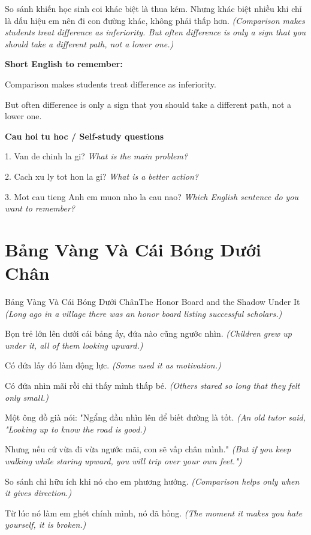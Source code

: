\begin{baihoc}
So sánh khiến học sinh coi khác biệt là thua kém. Nhưng khác biệt nhiều khi chỉ là dấu hiệu em nên đi con đường khác, không phải thấp hơn.
\textit{(Comparison makes students treat difference as inferiority. But often difference is only a sign that you should take a different path, not a lower one.)}
\end{baihoc}

\begin{ghinhoanh}
\textbf{Short English to remember:}

Comparison makes students treat difference as inferiority.

But often difference is only a sign that you should take a different path, not a lower one.

\end{ghinhoanh}

\begin{tuhocnhanh}
\textbf{Cau hoi tu hoc / Self-study questions}

1. Van de chinh la gi? \textit{What is the main problem?}

2. Cach xu ly tot hon la gi? \textit{What is a better action?}

3. Mot cau tieng Anh em muon nho la cau nao? \textit{Which English sentence do you want to remember?}
\end{tuhocnhanh}
\ngancach

\section{Bảng Vàng Và Cái Bóng Dưới Chân}
\begin{truyen}{Bảng Vàng Và Cái Bóng Dưới Chân}{The Honor Board and the Shadow Under It}
\textit{(Long ago in a village there was an honor board listing successful scholars.)}

Bọn trẻ lớn lên dưới cái bảng ấy, đứa nào cũng ngước nhìn.
\textit{(Children grew up under it, all of them looking upward.)}

Có đứa lấy đó làm động lực.
\textit{(Some used it as motivation.)}

Có đứa nhìn mãi rồi chỉ thấy mình thấp bé.
\textit{(Others stared so long that they felt only small.)}

Một ông đồ già nói: "Ngẩng đầu nhìn lên để biết đường là tốt.
\textit{(An old tutor said, "Looking up to know the road is good.)}

Nhưng nếu cứ vừa đi vừa ngước mãi, con sẽ vấp chân mình."
\textit{(But if you keep walking while staring upward, you will trip over your own feet.")}

So sánh chỉ hữu ích khi nó cho em phương hướng.
\textit{(Comparison helps only when it gives direction.)}

Từ lúc nó làm em ghét chính mình, nó đã hỏng.
\textit{(The moment it makes you hate yourself, it is broken.)}

\end{truyen}

